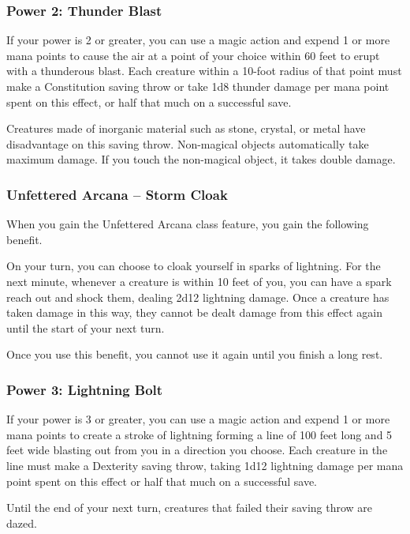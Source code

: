 \documentclass[12pt,letterpaper,twocolumn,openany,nodeprecatedcode,bg=none]{dndbook}
\begin{document}
\subsubsection{Power 2: Thunder Blast}\label{power-2-thunder-blast}

If your power is 2 or greater, you can use a magic action and expend 1
or more mana points to cause the air at a point of your choice within 60
feet to erupt with a thunderous blast. Each creature within a 10-foot
radius of that point must make a Constitution saving throw or take 1d8
thunder damage per mana point spent on this effect, or half that much on
a successful save.

Creatures made of inorganic material such as stone, crystal, or metal
have disadvantage on this saving throw. Non-magical objects
automatically take maximum damage. If you touch the non-magical object,
it takes double damage.

\subsubsection{Unfettered Arcana -- Storm
Cloak}\label{unfettered-arcana-storm-cloak}

When you gain the Unfettered Arcana class feature, you gain the
following benefit.

On your turn, you can choose to cloak yourself in sparks of lightning.
For the next minute, whenever a creature is within 10 feet of you, you
can have a spark reach out and shock them, dealing 2d12 lightning
damage. Once a creature has taken damage in this way, they cannot be
dealt damage from this effect again until the start of your next turn.

Once you use this benefit, you cannot use it again until you finish a
long rest.

\subsubsection{Power 3: Lightning Bolt}\label{power-3-lightning-bolt}

If your power is 3 or greater, you can use a magic action and expend 1
or more mana points to create a stroke of lightning forming a line of
100 feet long and 5 feet wide blasting out from you in a direction you
choose. Each creature in the line must make a Dexterity saving throw,
taking 1d12 lightning damage per mana point spent on this effect or half
that much on a successful save.

Until the end of your next turn, creatures that failed their saving
throw are dazed.
\end{document}
